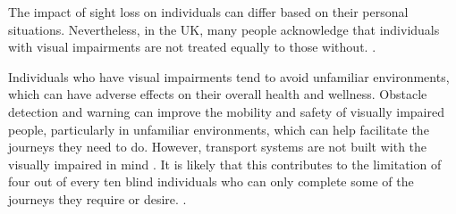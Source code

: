\documentclass[conference]{IEEEtran}
\begin{document}

The impact of sight loss on individuals can differ based on their personal situations. Nevertheless, in the UK, many people acknowledge that individuals with visual impairments are not treated equally to those without. \cite{b1}.



Individuals who have visual impairments tend to avoid unfamiliar environments, which can have adverse effects on their overall health and wellness. Obstacle detection and warning can improve the mobility and safety of visually impaired people, particularly in unfamiliar environments, which can help facilitate the journeys they need to do. However, transport systems are not built with the visually impaired in mind \cite{b2}. It is likely that this contributes to the limitation of four out of every ten blind individuals who can only complete some of the journeys they require or desire. \cite{b1}.
\end{document}
